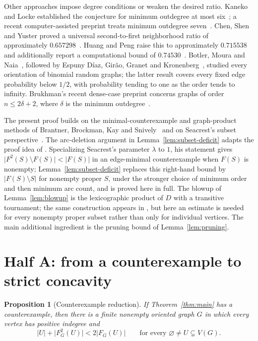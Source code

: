 \documentclass[11pt]{article}
\newtheorem{proposition}[theorem]{Proposition}
\theoremstyle{remark}
\newcommand{\abs}[1]{\lvert #1\rvert}
\begin{document}
Other approaches impose degree conditions or weaken the desired ratio.
Kaneko and Locke established the conjecture for minimum outdegree at most
six~\cite{KanekoLocke2001}; a recent computer-assisted preprint treats
minimum outdegree seven~\cite{SadhukhanSandeepSen2026}.
Chen, Shen and Yuster proved a universal second-to-first neighborhood
ratio of approximately $0.657298$~\cite{ChenShenYuster2003}.
Huang and Peng raise this to approximately $0.715538$ and additionally
report a computational bound of $0.74530$~\cite{HuangPeng2024}.
Botler, Moura and Naia~\cite{BotlerMouraNaia2023}, followed by
Espuny D\'iaz, Gir\~ao, Granet and Kronenberg~\cite{EspunyDiazEtAl2025},
studied every orientation of binomial random graphs; the latter result
covers every fixed edge probability below $1/2$, with probability tending
to one as the order tends to infinity. Brukhman's recent dense-case
preprint concerns graphs of order $n\leq 2\delta+2$, where $\delta$ is
the minimum outdegree~\cite{Brukhman2026}.

The present proof builds on the minimal-counterexample and graph-product
methods of Brantner, Brockman, Kay and
Snively~\cite{BrantnerBrockmanKaySnively2009} and on Seacrest's
subset perspective~\cite{Seacrest2019}. The arc-deletion argument in
Lemma~\ref{lem:subset-deficit} adapts the proof idea of
\cite[Lemma~4]{Seacrest2019}. Specializing Seacrest's parameter $\lambda$
to $1$, his statement gives
$\abs{F^2(S)\setminus F(S)}<\abs{F(S)}$ in an edge-minimal
counterexample when $F(S)$ is nonempty; Lemma~\ref{lem:subset-deficit}
replaces this right-hand bound by $\abs{F(S)\setminus S}$ for nonempty
proper $S$, under the stronger choice of minimum order and then minimum
arc count, and is proved here in full. The blowup of Lemma~\ref{lem:blowup}
is the lexicographic product of $D$ with a transitive tournament; the same
construction appears in \cite[Theorem~4.3]{BrantnerBrockmanKaySnively2009},
but here an estimate is needed for every nonempty proper subset rather than
only for individual vertices. The main additional ingredient is the pruning
bound of Lemma~\ref{lem:pruning}.

\section{Half A: from a counterexample to strict concavity}
\label{sec:reduction}

\begin{proposition}[Counterexample reduction]
\label{prop:counterexample-reduction}
If Theorem~\ref{thm:main} has a counterexample, then there is a finite
nonempty oriented graph $G$ in which every vertex has positive indegree
and
\begin{equation}
\label{eq:strict-subset-growth}
  \abs{U}+\abs{F_G^2(U)}<2\abs{F_G(U)}
  \qquad\text{for every }\varnothing\ne U\subsetneq V(G).
\end{equation}
\end{proposition}
\end{document}
